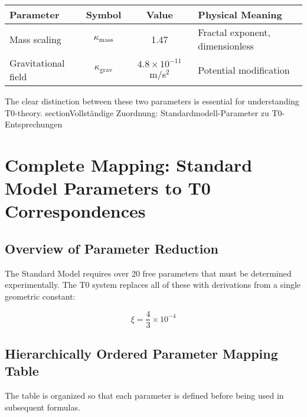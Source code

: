 \documentclass[12pt,a4paper]{article}
\begin{document}
	\begin{center}
		\begin{tabular}{|l|c|c|l|}
			\hline
			\textbf{Parameter} & \textbf{Symbol} & \textbf{Value} & \textbf{Physical Meaning} \\
			\hline
			Mass scaling & $\kappa_{\text{mass}}$ & 1.47 & Fractal exponent, dimensionless \\
			Gravitational field & $\kappa_{\text{grav}}$ & $4.8 \times 10^{-11}$ m/s$^2$ & Potential modification \\
			\hline
		\end{tabular}
	\end{center}
	
	The clear distinction between these two parameters is essential for understanding T0-theory.
section{Vollständige Zuordnung: Standardmodell-Parameter zu T0-Entsprechungen}
\label{sec:sm_t0_mapping}



\section{Complete Mapping: Standard Model Parameters to T0 Correspondences}
\label{sec:sm_t0_mapping}

\subsection{Overview of Parameter Reduction}
\label{subsec:parameter_overview}

The Standard Model requires over 20 free parameters that must be determined experimentally. The T0 system replaces all of these with derivations from a single geometric constant:

\begin{equation}
	\boxed{\xi = \frac{4}{3} \times 10^{-4}}
\end{equation}

\subsection{Hierarchically Ordered Parameter Mapping Table}
\label{subsec:hierarchical_mapping}

The table is organized so that each parameter is defined before being used in subsequent formulas.
\end{document}
